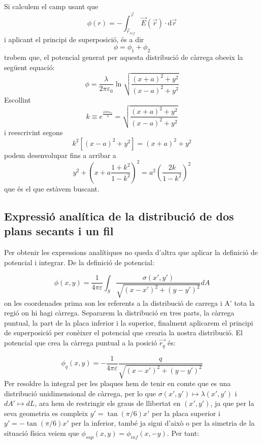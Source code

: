 \documentclass[a4paper,10.5pt]{report}
\begin{document}
\begin{appendices}
Si calculem el camp usant que
\begin{equation}
	\phi(r) = -\int_{\vec{r}_{ref}}^{\vec{r}}\vec{E}(\vec{r})\cdot \mathrm{d}\vec{r} 
\end{equation}
i aplicant el principi de superposició, és a dir
\begin{equation}
	\phi = \phi_1+\phi_2
\end{equation}
trobem que, el potencial generat per aquesta distribució de càrrega obeeix la següent equació:
\begin{equation}
	\phi = \frac{\lambda}{2\pi \varepsilon_0}\ln\sqrt{\frac{(x+a)^2+y^2}{(x-a)^2+y^2}}
\end{equation}
Escollint
\begin{equation}
	k \equiv e^{\frac{\phi2\pi\varepsilon_0}{\lambda}} = \sqrt{\frac{(x+a)^2+y^2}{(x-a)^2+y^2}}
\end{equation}
i reescrivint segons
\begin{equation}
	k^2[(x-a)^2+y^2]=(x+a)^2+y^2
\end{equation}  
podem desenvolupar fins a arribar a
\begin{equation}
	\boxed{y^2+\left( x+a\frac{1+k^2}{1-k^2}\right)^2 = a^2\left( \frac{2k}{1-k^2}\right)^2}
\end{equation}
que és el que estàvem buscant.

\newpage

\subsection{Expressió analítica de la distribució de dos plans secants i un fil}
\label{an:a6}
Per obtenir les expressions analítiques no queda d'altra que aplicar la definició de potencial i integrar. De la definició de potencial:

\begin{equation}
	\phi (x,y) = \frac{1}{4\pi\varepsilon}\int_S\frac{\sigma(x',y')}{\sqrt{(x-x')^2+(y-y')^2}}dA
\end{equation}
on les coordenades prima son les referents a la distribució de carrega i A' tota la regió on hi hagi càrrega. Separarem la distribució en tres parts, la càrrega puntual, la part de la placa inferior i la superior, finalment aplicarem el principi de superposició per conèixer el potencial que crearia la nostra distribució. El potencial que crea la càrrega puntual a la posició $\vec{r_q}$ és:

\begin{equation}
	\phi_q (x,y) = -\frac{1}{4\pi\varepsilon}\frac{q}{\sqrt{(x-x')^2+(y-y')^2}}
\end{equation}
Per resoldre la integral per les plaques hem de tenir en comte que es una distribució unidimensional de càrrega, per lo que $\sigma(x',y') \longmapsto \lambda(x',y')$ i $dA' \longmapsto dL$, ara hem de restringir els graus de llibertat en $(x',y')$, ja que per la seva geometria es compleix $y' = \tan(\pi/6)x'$ per la placa superior i $y' = -\tan(\pi/6)x'$ per la inferior, també ja sigui d'això o per la simetria de la situació física veiem que $\phi_{sup}(x,y) = \phi_{inf}(x,-y)$. Per tant:


\end{appendices}
\end{document}

